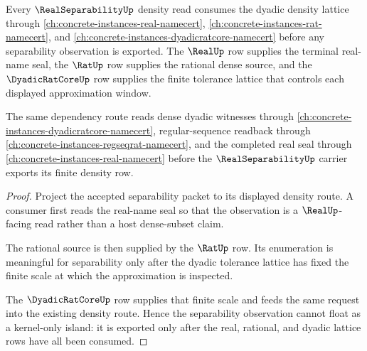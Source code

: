 \begin{theorem}
\label{thm:real-separability-dyadic-lattice-link}
Every $\RealSeparabilityUp$ density read consumes the dyadic density lattice through \autoref{ch:concrete-instances-real-namecert}, \autoref{ch:concrete-instances-rat-namecert}, and \autoref{ch:concrete-instances-dyadicratcore-namecert} before any separability observation is exported. The $\RealUp$ row supplies the terminal real-name seal, the $\RatUp$ row supplies the rational dense source, and the $\DyadicRatCoreUp$ row supplies the finite tolerance lattice that controls each displayed approximation window.

The same dependency route reads dense dyadic witnesses through \autoref{ch:concrete-instances-dyadicratcore-namecert}, regular-sequence readback through \autoref{ch:concrete-instances-regseqrat-namecert}, and the completed real seal through \autoref{ch:concrete-instances-real-namecert} before the $\RealSeparabilityUp$ carrier exports its finite density row.
\end{theorem}
\begin{proof}
Project the accepted separability packet to its displayed density route. A consumer first reads the real-name seal so that the observation is a $\RealUp$-facing read rather than a host dense-subset claim.

The rational source is then supplied by the $\RatUp$ row. Its enumeration is meaningful for separability only after the dyadic tolerance lattice has fixed the finite scale at which the approximation is inspected.

The $\DyadicRatCoreUp$ row supplies that finite scale and feeds the same request into the existing density route. Hence the separability observation cannot float as a kernel-only island: it is exported only after the real, rational, and dyadic lattice rows have all been consumed.
\end{proof}
